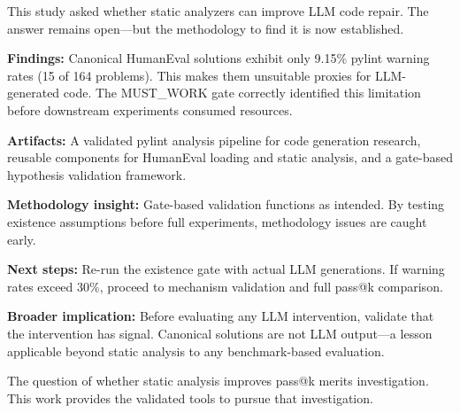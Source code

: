 
This study asked whether static analyzers can improve LLM code repair. The answer remains open---but the methodology to find it is now established.

\textbf{Findings:} Canonical HumanEval solutions exhibit only 9.15\% pylint warning rates (15 of 164 problems). This makes them unsuitable proxies for LLM-generated code. The MUST\_WORK gate correctly identified this limitation before downstream experiments consumed resources.

\textbf{Artifacts:} A validated pylint analysis pipeline for code generation research, reusable components for HumanEval loading and static analysis, and a gate-based hypothesis validation framework.

\textbf{Methodology insight:} Gate-based validation functions as intended. By testing existence assumptions before full experiments, methodology issues are caught early.

\textbf{Next steps:} Re-run the existence gate with actual LLM generations. If warning rates exceed 30\%, proceed to mechanism validation and full pass@k comparison.

\textbf{Broader implication:} Before evaluating any LLM intervention, validate that the intervention has signal. Canonical solutions are not LLM output---a lesson applicable beyond static analysis to any benchmark-based evaluation.

The question of whether static analysis improves pass@k merits investigation. This work provides the validated tools to pursue that investigation.
